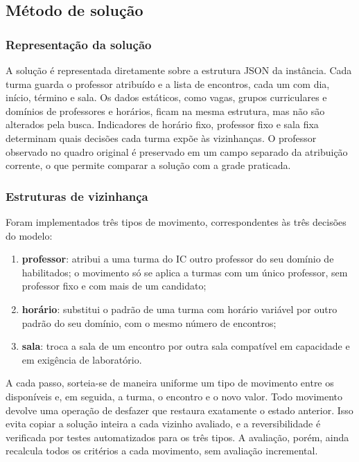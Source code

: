 \subsection{Método de solução}
\label{subsec:metodo}

\subsubsection{Representação da solução}

A solução é representada diretamente sobre a estrutura JSON da instância. Cada turma guarda o professor atribuído e a lista de encontros, cada um com dia, início, término e sala. Os dados estáticos, como vagas, grupos curriculares e domínios de professores e horários, ficam na mesma estrutura, mas não são alterados pela busca. Indicadores de horário fixo, professor fixo e sala fixa determinam quais decisões cada turma expõe às vizinhanças. O professor observado no quadro original é preservado em um campo separado da atribuição corrente, o que permite comparar a solução com a grade praticada.

\subsubsection{Estruturas de vizinhança}

Foram implementados três tipos de movimento, correspondentes às três decisões do modelo:
\begin{enumerate}
  \item \textbf{professor}: atribui a uma turma do IC outro professor do seu domínio de habilitados; o movimento só se aplica a turmas com um único professor, sem professor fixo e com mais de um candidato;
  \item \textbf{horário}: substitui o padrão de uma turma com horário variável por outro padrão do seu domínio, com o mesmo número de encontros;
  \item \textbf{sala}: troca a sala de um encontro por outra sala compatível em capacidade e em exigência de laboratório.
\end{enumerate}

A cada passo, sorteia-se de maneira uniforme um tipo de movimento entre os disponíveis e, em seguida, a turma, o encontro e o novo valor. Todo movimento devolve uma operação de desfazer que restaura exatamente o estado anterior. Isso evita copiar a solução inteira a cada vizinho avaliado, e a reversibilidade é verificada por testes automatizados para os três tipos. A avaliação, porém, ainda recalcula todos os critérios a cada movimento, sem avaliação incremental.

